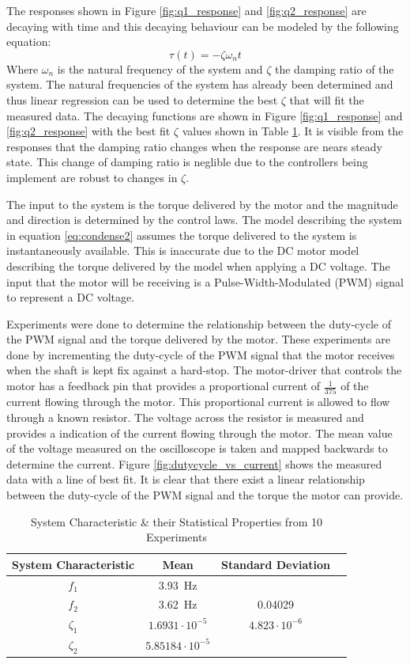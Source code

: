 The responses shown in Figure \ref{fig:q1_response} and \ref{fig:q2_response} are decaying with time and this decaying behaviour can be modeled by the following equation: $$\tau(t) = -\zeta \omega_{n} t$$ Where $\omega_{n}$ is the natural frequency of the system and $\zeta$ the damping ratio of the system. The natural frequencies of the system has already been determined and thus linear regression can be used to determine the best $\zeta$ that will fit the measured data. The decaying functions are shown in Figure \ref{fig:q1_response} and \ref{fig:q2_response} with the best fit $\zeta$ values shown in Table \ref{table:system_characteristic}. It is visible from the responses that the damping ratio changes when the response are nears steady state. This change of damping ratio is neglible due to the controllers being implement are robust to changes in $\zeta$.

The input to the system is the torque delivered by the motor and the magnitude and direction is determined by the control laws. The model describing the system in equation \ref{eq:condense2} assumes the torque delivered to the system is instantaneously available. This is inaccurate due to the DC motor model describing the torque delivered by the model when applying a DC voltage. The input that the motor will be receiving is a Pulse-Width-Modulated (PWM) signal to represent a DC voltage.

Experiments were done to determine the relationship between the duty-cycle of the PWM signal and the torque delivered by the motor. These experiments are done by incrementing the duty-cycle of the PWM signal that the motor receives when the shaft is kept fix against a hard-stop. The motor-driver that controls the motor has a feedback pin that provides a proportional current of $\frac{1}{375}$ of the current flowing through the motor. This proportional current is allowed to flow through a known resistor. The voltage across the resistor is measured and provides a indication of the current flowing through the motor. The mean value of the voltage measured on the oscilloscope is taken and mapped backwards to determine the current. Figure \ref{fig:dutycycle_vs_current} shows the measured data with a line of best fit. It is clear that there exist a linear relationship between the duty-cycle of the PWM signal and the torque the motor can provide.

\begin{table}[]
	\centering
	\begin{tabular}{|c|c|c|c|}
		\hline
		System Characteristic & Mean & Standard Deviation\\
		\hline
		\hline
		$f_{1}$ & \SI{3.93}{Hz} &  \\
		\hline
		$f_{2}$ & \SI{3.62}{Hz} & 0.04029 \\ 
		\hline
		$\zeta_{1}$ & $1.6931 \cdot10^{-5}$ & $4.823\cdot 10^{-6}$
		\\
		\hline
		$\zeta_{2}$ & $5.85184 \cdot 10^{-5}$ & \\
		\hline
	\end{tabular}
	\caption{System Characteristic \& their Statistical Properties from 10 Experiments}
	\label{table:system_characteristic}
\end{table}


